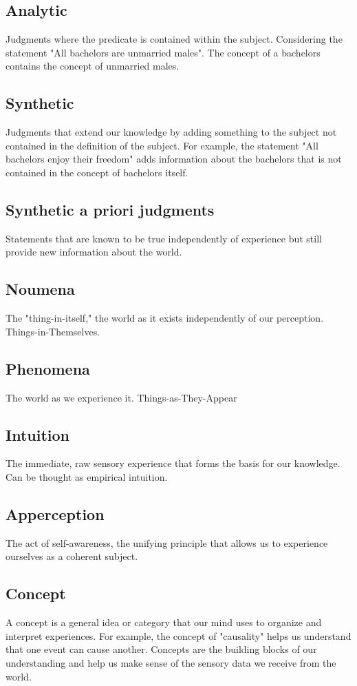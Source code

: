 \documentclass[a4paper]{article}
\begin{document}
\subsection{Analytic}
Judgments where the predicate is contained within the subject. 
Considering the statement "All bachelors are unmarried males".
The concept of a bachelors contains the concept of unmarried males. 

\subsection{Synthetic}
Judgments that extend our knowledge by adding something to the subject not contained in the definition of the subject.
For example, the statement "All bachelors enjoy their freedom" adds information about the bachelors that is not contained in the concept of bachelors itself.

\subsection{Synthetic a priori judgments}
Statements that are known to be true independently of experience but still provide new information about the world.

\subsection{Noumena}
The "thing-in-itself," the world as it exists independently of our perception.
Things-in-Themselves.

\subsection{Phenomena}
The world as we experience it. 
Things-as-They-Appear

\subsection{Intuition}
The immediate, raw sensory experience that forms the basis for our knowledge.
Can be thought as empirical intuition. 

\subsection{Apperception}
The act of self-awareness, the unifying principle that allows us to experience ourselves as a coherent subject.

\subsection{Concept}
A concept is a general idea or category that our mind uses to organize and interpret experiences. 
For example, the concept of "causality" helps us understand that one event can cause another. 
Concepts are the building blocks of our understanding and help us make sense of the sensory data we receive from the world.
\end{document}
